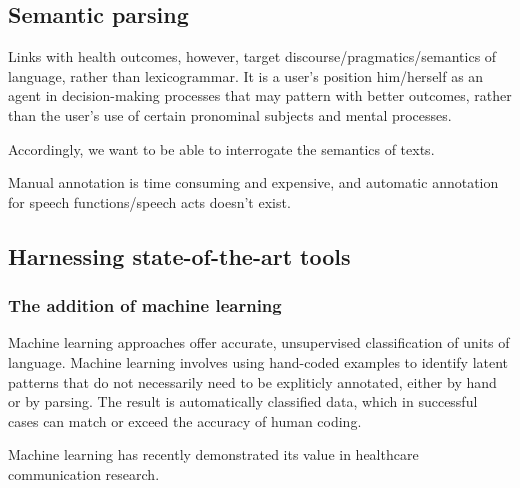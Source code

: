\subsection{Semantic parsing}

Links with health outcomes, however, target discourse/pragmatics/semantics of language, rather than lexicogrammar. It is a user's position him/herself as an agent in decision-making processes that may pattern with better outcomes, rather than the user's use of certain pronominal subjects and mental processes.

Accordingly, we want to be able to interrogate the semantics of texts.

Manual annotation is time consuming and expensive, and automatic annotation for speech functions/speech acts doesn't exist.

\subsection{Harnessing state-of-the-art tools} \lipsum



\subsubsection{The addition of machine learning} \lipsum

Machine learning approaches offer accurate, unsupervised classification of units of language. Machine learning involves using hand-coded examples to identify latent patterns that do not necessarily need to be expliticly annotated, either by hand or by parsing. The result is automatically classified data, which in successful cases can match or exceed the accuracy of human coding.

Machine learning has recently demonstrated its value in healthcare communication research.

